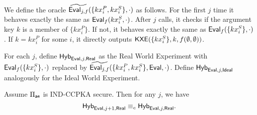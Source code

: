 \begin{definition}
We define the oracle $\widetilde{\mathsf{Eval}_{j, f}}(\{kx_i^P, kx_i^S\}, \cdot)$ as follows. For the first $j$ time it behaves exactly the same as $\mathsf{Eval}_f(kx_i^S, \cdot)$. After $j$ calls, it checks if the argument key $k$ is a member of $\{kx_i^P\}$. If not, it behaves exactly the same as $\mathsf{Eval}_f(\{kx_i^S\}, \cdot)$. If $k = kx_i^P$ for some $i$, it directly outputs $\mathsf{KXE}(\{kx_i^S\}, k, f(\emptyset, \emptyset))$.

    For each $j$, define $\mathsf{Hyb}_{\mathsf{Eval}, j, \mathsf{Real}}$ as the Real World Experiment with $\mathsf{Eval}_f(\{kx_i^S\}, \cdot)$ replaced by $\widetilde{\mathsf{Eval}_{j, f}}(\{kx_i^P, kx_i^S\}, \mathsf{Eval}, \cdot)$. Define $\mathsf{Hyb}_{\mathsf{Eval}, j, \mathsf{Ideal}}$ analogously for the Ideal World Experiment. 
\end{definition}
\begin{lemma}
     Assume $\Pi_{\mathsf{ae}}$ is IND-CCPKA secure. Then for any $j$, we have 
    $$\mathsf{Hyb}_{\mathsf{Eval}, j + 1, \mathsf{Real}} \equiv_c \mathsf{Hyb}_{\mathsf{Eval}, j, \mathsf{Real}}.$$
\end{lemma}
